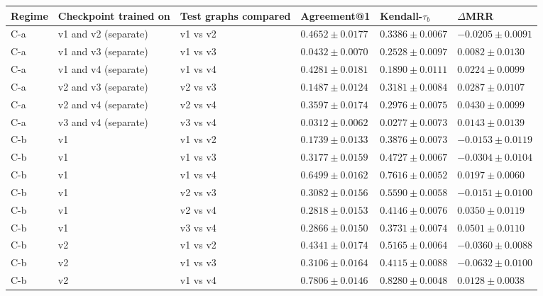 \begin{table}[htbp]
\centering
\small
\renewcommand{\arraystretch}{1.15}
\setlength{\tabcolsep}{5pt}
\begin{adjustbox}{max width=\linewidth}
\begin{tabular}{|l|l|l|l|l|l|}
\hline
\textbf{Regime} & \textbf{Checkpoint trained on} & \textbf{Test graphs compared} & \textbf{Agreement@1} & \textbf{Kendall-$\tau_b$} & \textbf{$\Delta$MRR} \\
\hline
C-a & v1 and v2 (separate) & v1 vs v2 & $0.4652 \pm 0.0177$ & $0.3386 \pm 0.0067$ & $-0.0205 \pm 0.0091$ \\
\hline
C-a & v1 and v3 (separate) & v1 vs v3 & $0.0432 \pm 0.0070$ & $0.2528 \pm 0.0097$ & $0.0082 \pm 0.0130$ \\
\hline
C-a & v1 and v4 (separate) & v1 vs v4 & $0.4281 \pm 0.0181$ & $0.1890 \pm 0.0111$ & $0.0224 \pm 0.0099$ \\
\hline
C-a & v2 and v3 (separate) & v2 vs v3 & $0.1487 \pm 0.0124$ & $0.3181 \pm 0.0084$ & $0.0287 \pm 0.0107$ \\
\hline
C-a & v2 and v4 (separate) & v2 vs v4 & $0.3597 \pm 0.0174$ & $0.2976 \pm 0.0075$ & $0.0430 \pm 0.0099$ \\
\hline
C-a & v3 and v4 (separate) & v3 vs v4 & $0.0312 \pm 0.0062$ & $0.0277 \pm 0.0073$ & $0.0143 \pm 0.0139$ \\
\hline
C-b & v1 & v1 vs v2 & $0.1739 \pm 0.0133$ & $0.3876 \pm 0.0073$ & $-0.0153 \pm 0.0119$ \\
\hline
C-b & v1 & v1 vs v3 & $0.3177 \pm 0.0159$ & $0.4727 \pm 0.0067$ & $-0.0304 \pm 0.0104$ \\
\hline
C-b & v1 & v1 vs v4 & $0.6499 \pm 0.0162$ & $0.7616 \pm 0.0052$ & $0.0197 \pm 0.0060$ \\
\hline
C-b & v1 & v2 vs v3 & $0.3082 \pm 0.0156$ & $0.5590 \pm 0.0058$ & $-0.0151 \pm 0.0100$ \\
\hline
C-b & v1 & v2 vs v4 & $0.2818 \pm 0.0153$ & $0.4146 \pm 0.0076$ & $0.0350 \pm 0.0119$ \\
\hline
C-b & v1 & v3 vs v4 & $0.2866 \pm 0.0150$ & $0.3731 \pm 0.0074$ & $0.0501 \pm 0.0110$ \\
\hline
C-b & v2 & v1 vs v2 & $0.4341 \pm 0.0174$ & $0.5165 \pm 0.0064$ & $-0.0360 \pm 0.0088$ \\
\hline
C-b & v2 & v1 vs v3 & $0.3106 \pm 0.0164$ & $0.4115 \pm 0.0088$ & $-0.0632 \pm 0.0100$ \\
\hline
C-b & v2 & v1 vs v4 & $0.7806 \pm 0.0146$ & $0.8280 \pm 0.0048$ & $0.0128 \pm 0.0038$ \\

\end{tabular}
\end{adjustbox}
\end{table}
